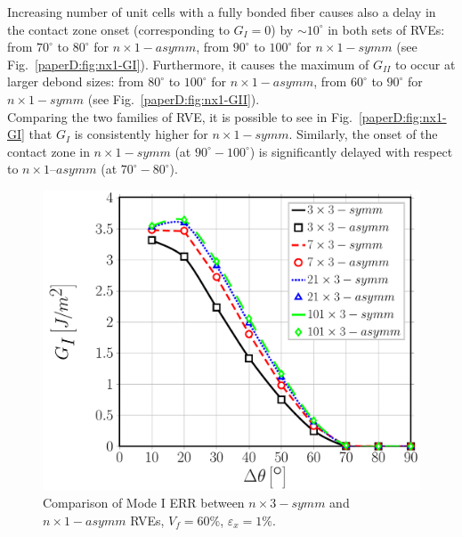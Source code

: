Increasing number of unit cells with a fully bonded fiber causes also a delay in the contact zone onset (corresponding to $G_{I}=0$) by $\sim10^{\circ}$  in both sets of RVEs: from $70^{\circ}$ to $80^{\circ}$ for $n \times 1−asymm$, from $90^{\circ}$ to $100^{\circ}$ for $n \times 1−symm$ (see Fig.~\ref{paperD:fig:nx1-GI}). Furthermore, it causes the maximum of $G_{II}$ to occur at larger debond sizes: from $80^{\circ}$ to $100^{\circ}$ for $n \times 1−asymm$, from $60^{\circ}$ to $90^{\circ}$ for $n \times 1−symm$ (see Fig.~\ref{paperD:fig:nx1-GII}).\\
Comparing the two families of RVE, it is possible to see in Fig.~\ref{paperD:fig:nx1-GI} that $G_{I}$ is consistently higher for $n \times 1−symm$. Similarly, the onset of the contact zone in $n \times 1−symm$ (at $90^{\circ}−100^{\circ}$) is significantly delayed with respect to $n \times 1 – asymm$ (at $70^{\circ} − 80^{\circ}$). 

\begin{figure}[!htb]
\centering
  \includegraphics[width=\textwidth]{paperD/nxk-coupling-vf60-GI.pdf}
\caption{Comparison of Mode I ERR between $n \times 3−symm$ and $n \times 1−asymm$ RVEs, $V_{f}=60\%$, $\varepsilon_{x}=1\%$.}\label{paperD:fig:nxk-GI}
\end{figure}

